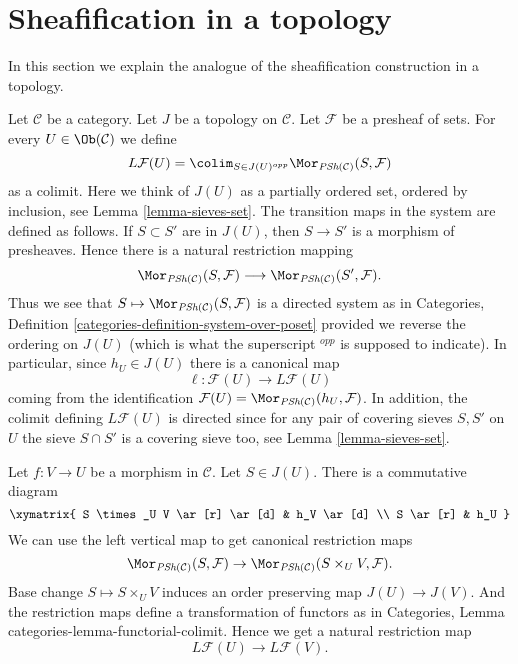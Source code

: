 \section{Sheafification in a topology}
\label{section-sheafification-topology}

\noindent
In this section we explain the analogue of the
sheafification construction in a topology.

\medskip\noindent
Let $\mathcal{C}$ be a category.
Let $J$ be a topology on $\mathcal{C}$.
Let $\mathcal{F}$ be a presheaf of sets.
For every $U \in \Ob(\mathcal{C})$ we
define
$$
L\mathcal{F}(U)
=
\colim_{S \in J(U)^{opp}}
\Mor_{\textit{PSh}(\mathcal{C})}(S, \mathcal{F})
$$
as a colimit. Here we think of $J(U)$ as a partially ordered set,
ordered by inclusion, see Lemma \ref{lemma-sieves-set}. The transition
maps in the system are defined as follows.
If $S \subset S'$ are in $J(U)$, then $S \to S'$ is
a morphism of presheaves. Hence there is a natural restriction
mapping
$$
\Mor_{\textit{PSh}(\mathcal{C})}(S, \mathcal{F})
\longrightarrow
\Mor_{\textit{PSh}(\mathcal{C})}(S', \mathcal{F}).
$$
Thus we see that
$S \mapsto \Mor_{\textit{PSh}(\mathcal{C})}(S, \mathcal{F})$
is a directed system as in Categories,
Definition \ref{categories-definition-system-over-poset}
provided we reverse the ordering
on $J(U)$ (which is what the superscript ${}^{opp}$ is supposed to
indicate). In particular, since $h_U \in J(U)$
there is a canonical map
$$
\ell : \mathcal{F}(U) \longrightarrow L\mathcal{F}(U)
$$
coming from the identification
$\mathcal{F}(U) = \Mor_{\textit{PSh}(\mathcal{C})}(h_U, \mathcal{F})$.
In addition, the colimit defining $L\mathcal{F}(U)$ is directed
since for any pair of covering sieves $S, S'$ on $U$ the
sieve $S \cap S'$ is a covering sieve too, see Lemma \ref{lemma-sieves-set}.

\medskip\noindent
Let $f : V \to U$ be a morphism in $\mathcal{C}$.
Let $S \in J(U)$. There is a commutative diagram
$$
\xymatrix{
S \times_U V \ar[r] \ar[d] & h_V \ar[d] \\
S \ar[r] & h_U
}
$$
We can use the left vertical map to get canonical restriction maps
$$
\Mor_{\textit{PSh}(\mathcal{C})}(S, \mathcal{F})
\to \Mor_{\textit{PSh}(\mathcal{C})}(S \times_U V, \mathcal{F}).
$$
Base change $S \mapsto S \times_U V$ induces an order
preserving map $J(U) \to J(V)$. And the restriction maps
define a transformation of functors as in
Categories, Lemma {categories-lemma-functorial-colimit}.
Hence we get a natural restriction map
$$
L\mathcal{F}(U) \longrightarrow L\mathcal{F}(V).
$$

